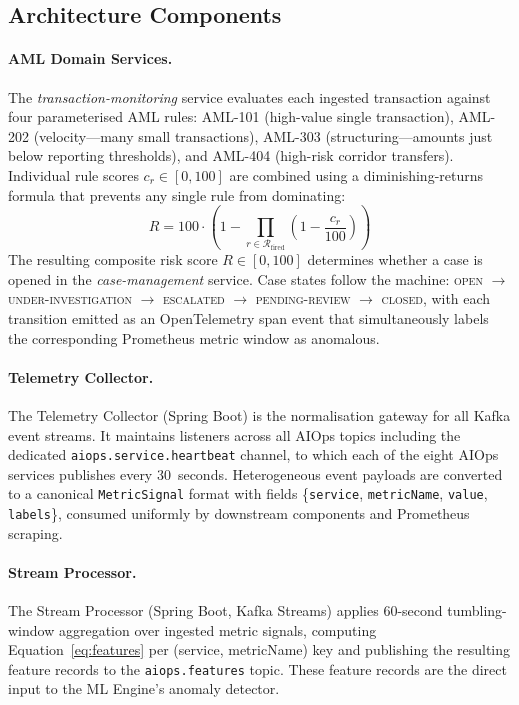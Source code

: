 \documentclass[a4paper,anonymous,UKenglish]{lipics-v2021}
\begin{document}
\subsection{Architecture Components}

\paragraph*{AML Domain Services.}
The \textit{transaction-monitoring} service evaluates each ingested transaction
against four parameterised AML rules: AML-101 (high-value single transaction),
AML-202 (velocity---many small transactions), AML-303
(structuring---amounts just below reporting thresholds), and AML-404
(high-risk corridor transfers). Individual rule scores $c_r \in [0, 100]$ are
combined using a diminishing-returns formula that prevents any single rule from
dominating:
\begin{equation}
    R = 100 \cdot \left(1 - \prod_{r \in \mathcal{R}_{\text{fired}}}
    \left(1 - \frac{c_r}{100}\right)\right)
    \label{eq:aml}
\end{equation}
The resulting composite risk score $R \in [0, 100]$ determines whether a case
is opened in the \textit{case-management} service. Case states follow the
machine: \textsc{open} $\to$ \textsc{under-investigation} $\to$
\textsc{escalated} $\to$ \textsc{pending-review} $\to$ \textsc{closed}, with
each transition emitted as an OpenTelemetry span event that simultaneously
labels the corresponding Prometheus metric window as anomalous.

\paragraph*{Telemetry Collector.}
The Telemetry Collector (Spring Boot) is the normalisation gateway for all
Kafka event streams. It maintains listeners across all AIOps topics including
the dedicated \texttt{aiops.service.heartbeat} channel, to which each of the
eight AIOps services publishes every 30~seconds. Heterogeneous event payloads
are converted to a canonical \texttt{MetricSignal} format with fields
\{\texttt{service}, \texttt{metricName}, \texttt{value}, \texttt{labels}\},
consumed uniformly by downstream components and Prometheus scraping.

\paragraph*{Stream Processor.}
The Stream Processor (Spring Boot, Kafka Streams) applies 60-second
tumbling-window aggregation over ingested metric signals, computing
Equation~\ref{eq:features} per (service, metricName) key and publishing the
resulting feature records to the \texttt{aiops.features} topic. These feature
records are the direct input to the ML Engine's anomaly detector.
\end{document}
